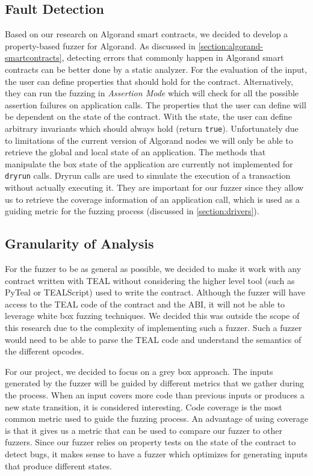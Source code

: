 \subsection*{Fault Detection}
Based on our research on Algorand smart contracts, we decided to develop a property-based fuzzer for Algorand.
As discussed in \ref{section:algorand-smartcontracts}, detecting errors that commonly happen in Algorand smart contracts can be better done by a static analyzer.
For the evaluation of the input, the user can define properties that should hold for the contract.
Alternatively, they can run the fuzzing in \textit{Assertion Mode} which will check for all the possible assertion failures on application calls.
The properties that the user can define will be dependent on the state of the contract.
With the state, the user can define arbitrary invariants which should always hold (return \texttt{true}).
Unfortunately due to limitations of the current version of Algorand nodes we will only be able to retrieve the global and local state of an application.
The methods that manipulate the box state of the application are currently not implemented for \texttt{dryrun} calls.
Dryrun calls are used to simulate the execution of a transaction without actually executing it.
They are important for our fuzzer since they allow us to retrieve the coverage information of an application call, which is used as a guiding metric for the fuzzing process (discussed in \ref{section:drivers}).

\subsection*{Granularity of Analysis}
For the fuzzer to be as general as possible, we decided to make it work with any contract written with \ac{TEAL} without considering the higher level tool (such as PyTeal or TEALScript) used to write the contract.
Although the fuzzer will have access to the \ac{TEAL} code of the contract and the \ac{ABI}, it will not be able to leverage white box fuzzing techniques.
We decided this was outside the scope of this research due to the complexity of implementing such a fuzzer.
Such a fuzzer would need to be able to parse the \ac{TEAL} code and understand the semantics of the different opcodes.

For our project, we decided to focus on a grey box approach.
The inputs generated by the fuzzer will be guided by different metrics that we gather during the process.
When an input covers more code than previous inputs or produces a new state transition, it is considered interesting.
Code coverage is the most common metric used to guide the fuzzing process.
An advantage of using coverage is that it gives us a metric that can be used to compare our fuzzer to other fuzzers.
Since our fuzzer relies on property tests on the state of the contract to detect bugs, it makes sense to have a fuzzer which optimizes for generating inputs that produce different states.

